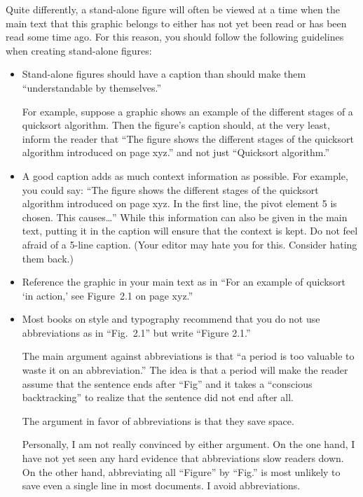Quite differently, a stand-alone figure will often be viewed at a time when the
main text that this graphic belongs to either has not yet been read or has been
read some time ago. For this reason, you should follow the following guidelines
when creating stand-alone figures:
%
\begin{itemize}
    \item Stand-alone figures should have a caption than should make them
        ``understandable by themselves.''

        For example, suppose a graphic shows an example of the different
        stages of a quicksort algorithm. Then the figure's caption should, at
        the very least, inform the reader that ``The figure shows the
        different stages of the quicksort algorithm introduced on page xyz.''
        and not just ``Quicksort algorithm.''
    \item A good caption adds as much context information as possible. For
        example, you could say: ``The figure shows the different stages of
        the quicksort algorithm introduced on page xyz. In the first line,
        the pivot element 5 is chosen. This causes\dots'' While this
        information can also be given in the main text, putting it in the
        caption will ensure that the context is kept. Do not feel afraid of a
        5-line caption. (Your editor may hate you for this. Consider hating
        them back.)
    \item Reference the graphic in your main text as in ``For an example of
        quicksort `in action,' see Figure~2.1 on page xyz.''
    \item Most books on style and typography recommend that you do not use
        abbreviations as in ``Fig.~2.1'' but write ``Figure 2.1.''

        The main argument against abbreviations is that ``a period is too
        valuable to waste it on an abbreviation.'' The idea is that a period
        will make the reader assume that the sentence ends after ``Fig'' and
        it takes a ``conscious backtracking'' to realize that the sentence
        did not end after all.

        The argument in favor of abbreviations is that they save space.

        Personally, I am not really convinced by either argument. On the one
        hand, I have not yet seen any hard evidence that abbreviations slow
        readers down. On the other hand,  abbreviating all ``Figure'' by
        ``Fig.'' is most unlikely to save even a single line in  most
        documents. I avoid abbreviations.
\end{itemize}


